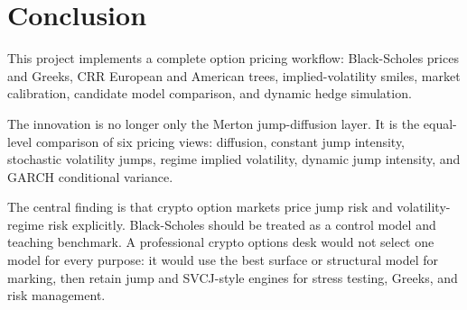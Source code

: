 \documentclass[11pt]{article}
\begin{document}
\section{Conclusion}

This project implements a complete option pricing workflow: Black-Scholes prices and Greeks, CRR European and American trees, implied-volatility smiles, market calibration, candidate model comparison, and dynamic hedge simulation.

The innovation is no longer only the Merton jump-diffusion layer. It is the equal-level comparison of six pricing views: diffusion, constant jump intensity, stochastic volatility jumps, regime implied volatility, dynamic jump intensity, and GARCH conditional variance.

The central finding is that crypto option markets price jump risk and volatility-regime risk explicitly. Black-Scholes should be treated as a control model and teaching benchmark. A professional crypto options desk would not select one model for every purpose: it would use the best surface or structural model for marking, then retain jump and SVCJ-style engines for stress testing, Greeks, and risk management.
\end{document}
